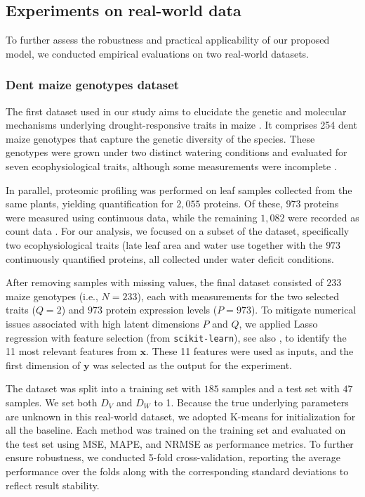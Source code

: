 \documentclass{article}
\def\vx{{\bm{x}}}
\def\vy{{\bm{y}}}
\begin{document}
\subsection{Experiments on real-world data}

To further assess the robustness and practical applicability of our proposed model, we conducted empirical evaluations on two real-world datasets.

\subsubsection{Dent maize genotypes dataset}
The first dataset used in our study aims to elucidate the genetic and molecular mechanisms underlying drought-responsive traits in maize \cite{prado2018phenomics,blein2020systems}. It comprises 254 dent maize genotypes that capture the genetic diversity of the species. These genotypes were grown under two distinct watering conditions and evaluated for seven ecophysiological traits, although some measurements were incomplete \cite{prado2018phenomics}.

In parallel, proteomic profiling was performed on leaf samples collected from the same plants, yielding quantification for $2,055$ proteins. Of these, $973$ proteins were measured using continuous data, while the remaining $1,082$ were recorded as count data \cite{blein2020systems}. For our analysis, we focused on a subset of the dataset, specifically two ecophysiological traits (late leaf area and water use together with the $973$ continuously quantified proteins, all collected under water deficit conditions.

After removing samples with missing values, the final dataset consisted of $233$ maize genotypes (i.e., \( N=233 \)), each with measurements for the two selected traits (\( Q=2 \)) and $973$ protein expression levels (\( P=973 \)). To mitigate numerical issues associated with high latent dimensions \( P \) and \( Q \), we applied Lasso regression with feature selection (from \texttt{scikit-learn}), see also \cite{friedman_regularization_2010,tibshirani_regression_1996}, to identify the 11 most relevant features from \( \vx \). These 11 features were used as inputs, and the first dimension of \( \vy \) was selected as the output for the experiment.

The dataset was split into a training set with $185$ samples and a test set with $47$ samples. We set both \( D_V \) and \( D_W \) to 1. Because the true underlying parameters are unknown in this real-world dataset, we adopted K-means for initialization for all the baseline. Each method was trained on the training set and evaluated on the test set using MSE, MAPE, and NRMSE as performance metrics. To further ensure robustness, we conducted 5-fold cross-validation, reporting the average performance over the folds along with the corresponding standard deviations to reflect result stability.
\end{document}
